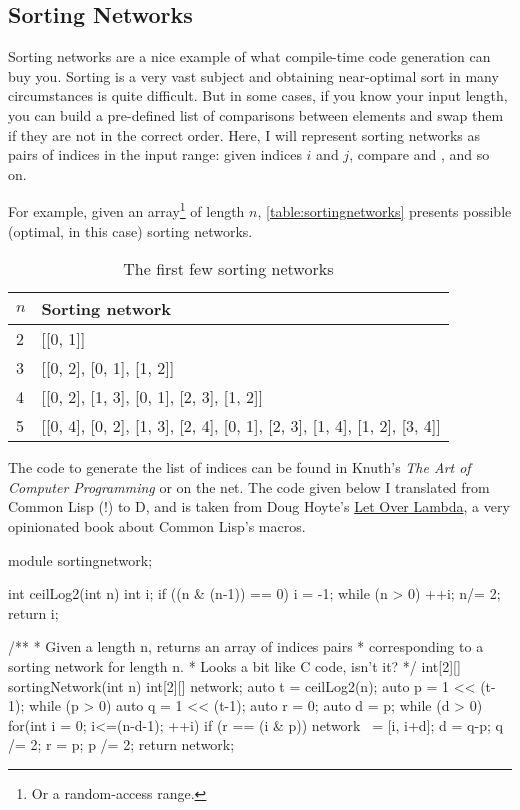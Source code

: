 \subsection{Sorting Networks}\label{sortingnetworks}

Sorting networks are a nice example of what compile-time code generation can buy you. Sorting is a very vast subject and obtaining near-optimal sort in many circumstances is quite difficult. But in some cases, if you know your input length, you can build a pre-defined list of comparisons between elements and swap them if they are not in the correct order. Here, I will represent sorting networks as pairs of indices in the input range: given indices $i$ and $j$, compare  and , and so on.

For example, given an array\footnote{ Or a random-access range.} of length $n$, \autoref{table:sortingnetworks} presents possible (optimal, in this case) sorting networks.

\begin{table}[htb]
\centering
\begin{tabular}[c]{|l|l|}
\hline
$n$ & Sorting network \\ \hline \hline
2   & [[0, 1]] \\ \hline
3   & [[0, 2], [0, 1], [1, 2]] \\ \hline
4   & [[0, 2], [1, 3], [0, 1], [2, 3], [1, 2]] \\ \hline
5   & [[0, 4], [0, 2], [1, 3], [2, 4], [0, 1], [2, 3], [1, 4], [1, 2], [3, 4]] \\ \hline
\end{tabular}
\caption{The first few sorting networks}
\label{table:sortingnetworks}
\end{table}

The code to generate the list of indices can be found in Knuth's \emph{The Art of Computer Programming} or on the net. The code given below I translated from Common Lisp (!) to D, and is taken from Doug Hoyte's \href{http://letoverlambda.com}{Let Over Lambda}, a very opinionated book about Common Lisp's macros.

\begin{dcode}
module sortingnetwork;

int ceilLog2(int n)
{
    int i;
    if ((n & (n-1)) == 0) i = -1;
    while (n > 0) { ++i; n/= 2;}
    return i;
}

/**
 * Given a length n, returns an array of indices pairs
 * corresponding to a sorting network for length n.
 * Looks a bit like C code, isn't it?
 */
int[2][] sortingNetwork(int n)
{
    int[2][] network;
    auto t = ceilLog2(n);
    auto p = 1 << (t-1);
    while (p > 0)
    {
        auto q = 1 << (t-1);
        auto r = 0;
        auto d = p;
        while (d > 0)
        {
            for(int i = 0; i<=(n-d-1); ++i)
            {
                if (r == (i & p)) network ~= [i, i+d];
            }
            d = q-p;
            q /= 2;
            r = p;
        }
        p /= 2;
    }
    return network;
}
\end{dcode}

